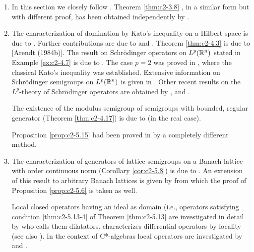\begin{enumerate}[label=\emph{Section \arabic*:}, wide]
\item  In this section we closely follow \citet{arendt:1984}. Theorem \ref{thm:c2-3.8}  , in a similar form but with different proof, has been obtained independently by \citet{schep:1985}.

 
\item  The characterization of domination by Kato's inequality on a Hilbert space is due to \citet{simon:1977}. Further contributions are due to \citet{hessetal:1977} and \citet{kishimotorobinson:1980}. Theorem \ref{thm:c2-4.3} is due to [Arendt (1984b)]. The result on Schrödinger operators on $L^p(\mathbb{R}^n)$ stated in Example \ref{ex:c2-4.7} is due to \citet{kato:1986}. The case $p = 2$ was proved in \citet{kato:1973}, where the classical Kato's inequality was established. Extensive information on Schrödinger semigroups on $L^p(\mathbb{R}^n)$ is given in \citet{simon:1982}. Other recent results on the $L^p$-theory of Schrödinger operators are obtained by \citet{davies:1986}, \citet{okazawa:1984} and \citet{voigt:1984a}.

The existence of the modulus semigroup of semigroups with bounded, regular generator (Theorem \ref{thm:c2-4.17}) is due to \citet{derndinger:1984} (in the real case).

Proposition \ref{prop:c2-5.15}   had been proved in \citet{schaeferetal:1978} by a completely different method.
 
\item  
The characterization of generators of lattice semigroups on a Banach lattice with order continuous norm (Corollary  \ref{cor:c2-5.8}) is due to \citet{nageluhlig:1981}. An extension of this result to arbitrary Banach lattices is given by \citet{arendt:1982} from which the proof of  Proposition  \ref{prop:c2-5.6}   is taken as well.

Local closed operators having an ideal as domain (i.e., operators satisfying condition \ref{thm:c2-5.13-4} of Theorem \ref{thm:c2-5.13}  are investigated in detail by \citet{nakano:1950} who calls them dilatators. \citet{peetre:1959} characterizes differential operators by locality (see also \citet{luxemburg:1979}). In the context of C*-algebras local operators are investigated by \citet{batty:1985} and \citet{battyrobinson:1985}.

\end{enumerate}

\RaggedRight

 